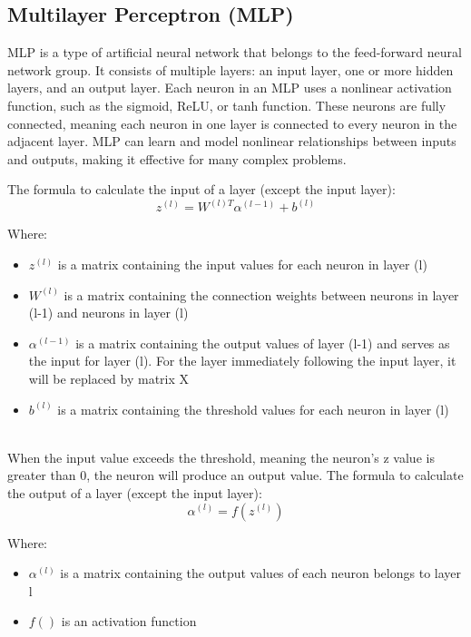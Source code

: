 \documentclass{ieeeojies}
\begin{document}
\subsection{Multilayer Perceptron (MLP)}
MLP is a type of artificial neural network that belongs to the feed-forward neural network group. It consists of multiple layers: an input layer, one or more hidden layers, and an output layer. Each neuron in an MLP uses a nonlinear activation function, such as the sigmoid, ReLU, or tanh function. These neurons are fully connected, meaning each neuron in one layer is connected to every neuron in the adjacent layer. MLP can learn and model nonlinear relationships between inputs and outputs, making it effective for many complex problems.

The formula to calculate the input of a layer (except the input layer):\\

\[ z^{(l)} = W^{(l) T}\alpha^{(l-1)} + b^{(l)} \]

Where:\\
    \begin{itemize}
        \item $z^{(l)}$ is a matrix containing the input values for each neuron in layer (l)
        \item $W^{(l)}$ is a matrix containing the connection weights between neurons in layer (l-1) and neurons in layer (l)
        \item $\alpha^{(l-1)}$ is a matrix containing the output values of layer (l-1) and serves as the input for layer (l). For the layer immediately following the input layer, it will be replaced by matrix X
        \item $b^{(l)}$ is a matrix containing the threshold values for each neuron in layer (l)
    \end{itemize}\\
        
When the input value exceeds the threshold, meaning the neuron's z value is greater than 0, the neuron will produce an output value. The formula to calculate the output of a layer (except the input layer):\\

\[ \alpha^{(l)} = f(z^{(l)}) \]

Where:\\
    \begin{itemize}
        \item $\alpha^{(l)}$ is a matrix containing the output values of each neuron belongs to layer l
        \item  $f()$ is an activation function
    \end{itemize}\\
    
\end{document}
